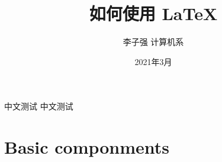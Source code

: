 \documentclass{libs/SUSTech_format}
\title[如何使用 \LaTeX]{\huge \textbf{ 如何使用 \LaTeX}}
\author{李子强 \enskip 计算机系}
\institute{\raggedleft 南方科技大学图书馆}
\date{2021年3月}
\begin{document}



{
    \begin{frame}
    \maketitle
    \end{frame}
}


\begin{frame}{中文测试}
    中文测试\end{frame}


\section{Basic componments}
\end{document}
